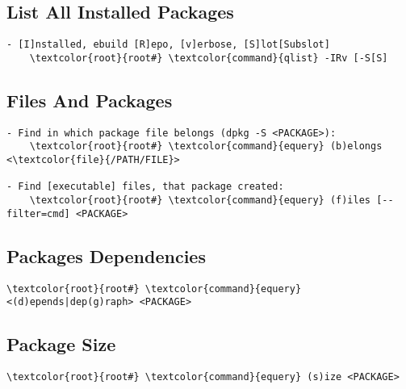 \documentclass[10pt, a4paper, onecolumn, openany]{book}         %
\begin{document}
\subsection{List All Installed Packages}
\begin{Verbatim}[commandchars=\\\{\}]
- [I]nstalled, ebuild [R]epo, [v]erbose, [S]lot[Subslot]
    \textcolor{root}{root#} \textcolor{command}{qlist} -IRv [-S[S]
\end{Verbatim}

\subsection{Files And Packages}
\begin{Verbatim}[commandchars=\\\{\}]
- Find in which package file belongs (dpkg -S <PACKAGE>):
    \textcolor{root}{root#} \textcolor{command}{equery} (b)elongs <\textcolor{file}{/PATH/FILE}>
    
- Find [executable] files, that package created:
    \textcolor{root}{root#} \textcolor{command}{equery} (f)iles [--filter=cmd] <PACKAGE>
\end{Verbatim}

\subsection{Packages Dependencies}
\begin{Verbatim}[commandchars=\\\{\}]
    \textcolor{root}{root#} \textcolor{command}{equery} <(d)epends|dep(g)raph> <PACKAGE>
\end{Verbatim}

\subsection{Package Size}
\begin{Verbatim}[commandchars=\\\{\}]
    \textcolor{root}{root#} \textcolor{command}{equery} (s)ize <PACKAGE>
\end{Verbatim}
\end{document}
